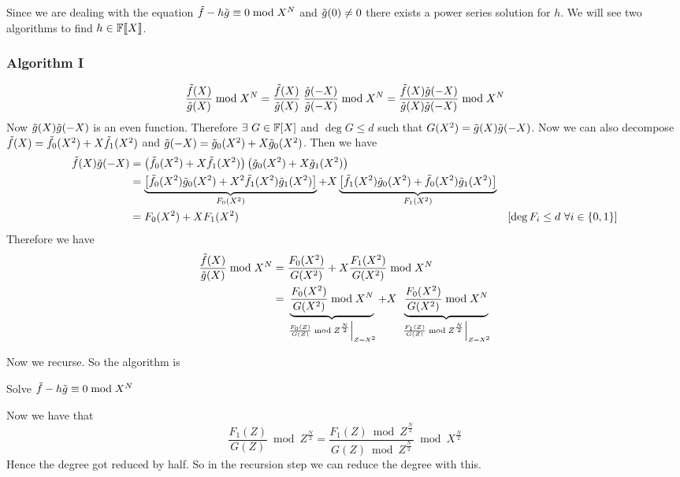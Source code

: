 Since we are dealing with the equation $\tilde{f}-h\tilde{g}\equiv 0\bmod{X^N}$ and $\tilde{g}(0)\neq 0$ there exists a power series solution for $h$. We will see two algorithms to find $h\in \mathbb{F}\llbracket X\rrbracket$.

\subsubsection{Algorithm I}
 \begin{align*}
 	\frac{\tilde{f}(X)}{\tilde{g}(X)}\bmod{X^N}  = \frac{\tilde{f}(X)}{\tilde{g}(X)}\;\frac{\tilde{g}(-X)}{\tilde{g}(-X)}\bmod{X^N} = \frac{\tilde{f}(X)\tilde{g}(-X)}{\tilde{g}(X)\tilde{g}(-X)}\bmod{X^N}
 \end{align*}Now $\tilde{g}(X)\tilde{g}(-X)$ is an even function. Therefore $\exists\ G\in\mathbb{F}[X]$ and $\deg G\leq d$ such that $G(X^2)=\tilde{g}(X)\tilde{g}(-X)$. Now we can also decompose $\tilde{f}(X)=\tilde{f}_0(X^2)+X\tilde{f}_1(X^2)$ and $\tilde{g}(-X)=\tilde{g}_0(X^2)+X\tilde{g}_0(X^2)$. Then we have 
\begin{align*}
	 \tilde{f}(X)\tilde{g}(-X) & = \left(\tilde{f}_0(X^2)+X\tilde{f}_1(X^2)\right)\left(\tilde{g}_0(X^2)+X\tilde{g}_1(X^2)\right)\\
	 & = \underbrace{\left[ \tilde{f}_0(X^2)\tilde{g}_0(X^2)+X^2\tilde{f}_1(X^2)\tilde{g}_1(X^2)\right]}_{F_0(X^2)}+X\underbrace{\left[\tilde{f}_1(X^2)\tilde{g}_0(X^2)+\tilde{f}_0(X^2)\tilde{g}_1(X^2)\right]}_{F_1(X^2)}\\
	 &=F_0(X^2)+XF_1(X^2) & [\deg F_i\leq d\ \forall i\in\{0,1\}]
\end{align*}Therefore we have \begin{align*}
\frac{\tilde{f}(X)}{\tilde{g}(X)}\bmod{X^N}  & = \frac{F_0(X^2)}{G(X^2)}+X\frac{F_1(X^2)}{G(X^2)}\bmod{X^N} \\
	& = \underbrace{\frac{F_0(X^2)}{G(X^2)}\bmod{X^N}}_{\left.\frac{F_0(Z)}{G(Z)}\bmod{Z^{\frac{N}2}}\right|_{Z=X^2}}+X\;\underbrace{\frac{F_0(X^2)}{G(X^2)}\bmod{X^N}}_{\left.\frac{F_1(Z)}{G(Z)}\bmod{Z^{\frac{N}2}}\right|_{Z=X^2}}
\end{align*}

Now we recurse. So the algorithm is
\begin{algorithm}
	\DontPrintSemicolon
	\caption{Solve $\tilde{f}-h\tilde{g}\equiv 0\bmod {X^N}$}
\end{algorithm}

Now we have that $$\frac{F_1(Z)}{G(Z)}\bmod{Z^{\frac{N}2}}=\frac{F_1(Z)\bmod{Z^{\frac{N}2}}}{G(Z)\bmod{Z^{\frac{N}2}}}\bmod{X^{\frac{N}2}}$$Hence the degree got reduced by half. So in the recursion step we can reduce the degree with this. \parinf\vspace{5mm}

